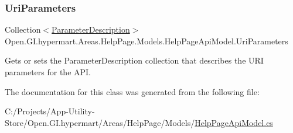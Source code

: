 \subsubsection{\texorpdfstring{Uri\+Parameters}{UriParameters}}
{\footnotesize\ttfamily Collection$<$\hyperlink{class_open_1_1_g_i_1_1hypermart_1_1_areas_1_1_help_page_1_1_model_descriptions_1_1_parameter_description}{Parameter\+Description}$>$ Open.\+G\+I.\+hypermart.\+Areas.\+Help\+Page.\+Models.\+Help\+Page\+Api\+Model.\+Uri\+Parameters\hspace{0.3cm}{\ttfamily [get]}}



Gets or sets the Parameter\+Description collection that describes the U\+RI parameters for the A\+PI. 



The documentation for this class was generated from the following file\+:\begin{DoxyCompactItemize}
\item 
C\+:/\+Projects/\+App-\/\+Utility-\/\+Store/\+Open.\+G\+I.\+hypermart/\+Areas/\+Help\+Page/\+Models/\hyperlink{_help_page_api_model_8cs}{Help\+Page\+Api\+Model.\+cs}\end{DoxyCompactItemize}
